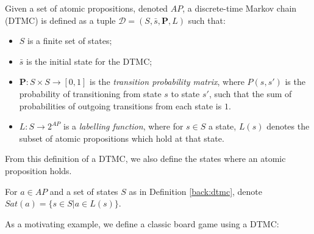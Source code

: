 \begin{definition}
\label{back:dtmc}
    Given a set of atomic propositions, denoted $AP$, a discrete-time Markov chain (DTMC) is defined as a tuple $\mathcal{D} = (S, \bar{s}, \mathbf{P}, L)$ such that:

    \begin{itemize}
        \item $S$ is a finite set of states;
        \item $\bar{s}$ is the initial state for the DTMC;
        \item $\mathbf{P} : S \times S \rightarrow [0,1]$ is the \emph{transition probability matrix}, where $P(s, s')$ is the probability of transitioning from state $s$ to state $s'$, such that the sum of probabilities of outgoing transitions from each state is $1$.
        \item $L: S \rightarrow 2^{AP}$ is a \emph{labelling function}, where for $s \in S$ a state, $L(s)$ denotes the subset of atomic propositions which hold at that state.
    \end{itemize}

\end{definition}


From this definition of a DTMC, we also define the states where an atomic proposition holds.

\begin{definition}
\label{back:sat}

    For $a \in AP$ and a set of states $S$ as in Definition \ref{back:dtmc}, denote $Sat(a) = \{s \in S | a \in L(s)\}$.

\end{definition}


As a motivating example, we define a classic board game using a DTMC:

